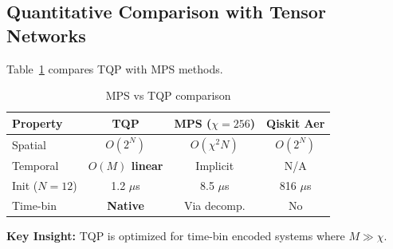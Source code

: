 \documentclass[aps,prx,twocolumn,superscriptaddress,floatfix]{revtex4-2}
\begin{document}
\subsection{Quantitative Comparison with Tensor Networks}
\label{sec:mps_comparison}

Table~\ref{tab:mps} compares TQP with MPS methods.

\begin{table}[htbp]
\caption{MPS vs TQP comparison}
\label{tab:mps}
\begin{ruledtabular}
\begin{tabular}{lccc}
Property & TQP & MPS ($\chi=256$) & Qiskit Aer \\
\hline
Spatial & $O(2^N)$ & $O(\chi^2 N)$ & $O(2^N)$ \\
Temporal & \textbf{$O(M)$ linear} & Implicit & N/A \\
Init ($N=12$) & 1.2 $\mu$s & 8.5 $\mu$s & 816 $\mu$s \\
Time-bin & \textbf{Native} & Via decomp. & No \\
\end{tabular}
\end{ruledtabular}
\end{table}

\textbf{Key Insight:} TQP is optimized for time-bin encoded systems where $M \gg \chi$.


\end{document}
